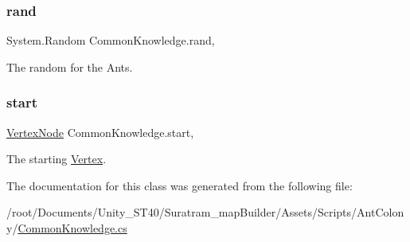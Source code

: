\subsubsection{\texorpdfstring{rand}{rand}}
{\footnotesize\ttfamily System.\+Random Common\+Knowledge.\+rand\hspace{0.3cm}{\ttfamily [get]}, {}}



The random for the Ants.

\mbox{\label{classCommonKnowledge_a968607c5b3027dc7db9178375a2071f2}} 
\subsubsection{\texorpdfstring{start}{start}}
{\footnotesize\ttfamily \hyperlink{classVertexNode}{Vertex\+Node} Common\+Knowledge.\+start\hspace{0.3cm}{\ttfamily [get]}, {}}



The starting \hyperlink{structVertex}{Vertex}.



The documentation for this class was generated from the following file\+:\begin{DoxyCompactItemize}
\item 
/root/\+Documents/\+Unity\+\_\+\+S\+T40/\+Suratram\+\_\+map\+Builder/\+Assets/\+Scripts/\+Ant\+Colony/\hyperlink{CommonKnowledge_8cs}{Common\+Knowledge.\+cs}\end{DoxyCompactItemize}
